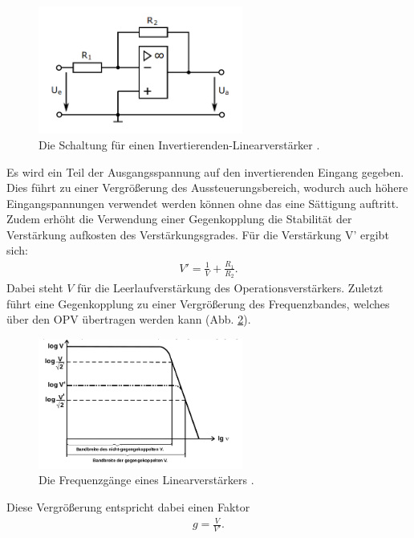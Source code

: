     \begin{figure}
    \centering
    \includegraphics[width=0.6\textwidth]{Pics/linear.png}
    \caption{Die Schaltung für einen Invertierenden-Linearverstärker \cite{anleitungneu}.}
    \label{fig:linear}
    \end{figure}

    Es wird ein Teil der Ausgangsspannung auf den invertierenden Eingang gegeben. Dies führt zu einer Vergrößerung des Aussteuerungsbereich, wodurch auch höhere Eingangspannungen verwendet werden
    können ohne das eine Sättigung auftritt. Zudem erhöht die Verwendung einer Gegenkopplung die Stabilität der Verstärkung aufkosten des Verstärkungsgrades.
    Für die Verstärkung V' ergibt sich:
    \begin{align}
        V' = \frac{1}{V} + \frac{R_1}{R_2}.
    \end{align}
    Dabei steht $V$ f\"ur die Leerlaufverstärkung des Operationsverstärkers.
    Zuletzt führt eine Gegenkopplung zu einer Vergrößerung des Frequenzbandes, welches über den OPV übertragen werden kann (Abb. \ref{fig:frequenz}).

    \begin{figure}
    \centering
    \includegraphics[width=0.6\textwidth]{Pics/frequenz.png}
    \caption{Die Frequenzgänge eines Linearverstärkers \cite{anleitungalt}.}
    \label{fig:frequenz}
    \end{figure}

    Diese Vergrößerung entspricht dabei einen Faktor
    \begin{align}
        g = \frac{V}{V'}.
    \end{align}

